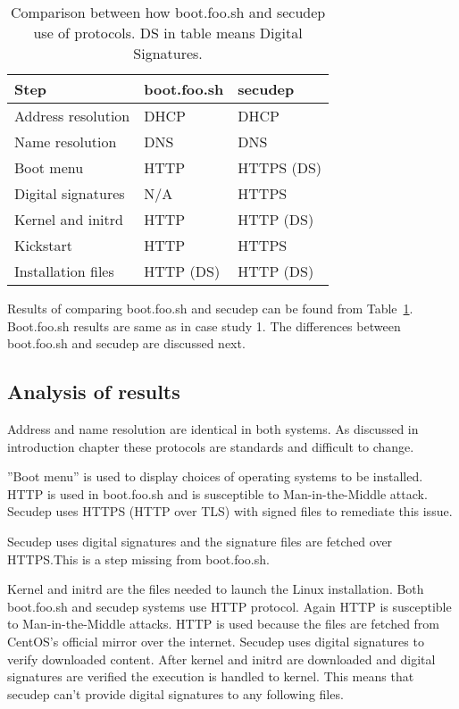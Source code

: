 \begin{table}[!ht]
  \def\arraystretch{1.1}%
  \begin{center}
    \begin{tabular}{| l | l | l |}
      \hline
      Step               & boot.foo.sh   & secudep    \\
      \hline
      Address resolution & DHCP          & DHCP       \\
      Name resolution    & DNS           & DNS        \\
      Boot menu          & HTTP          & HTTPS (DS) \\
      Digital signatures & N/A           & HTTPS      \\
      Kernel and initrd  & HTTP          & HTTP (DS)  \\
      Kickstart          & HTTP          & HTTPS      \\
      Installation files & HTTP (DS)     & HTTP (DS)  \\
      \hline
    \end{tabular}
    \caption{Comparison between how boot.foo.sh and secudep use of
      protocols. DS in table means Digital
      Signatures.\label{tab:comparison_table}}
  \end{center}
\end{table}

Results of comparing boot.foo.sh and secudep can be found from
Table~\ref{tab:comparison_table}. Boot.foo.sh results are same as in
case study 1. The differences between boot.foo.sh and secudep are
discussed next.


\subsection{Analysis of results}

Address and name resolution are identical in both systems. As
discussed in introduction chapter these protocols are standards and
difficult to change.

''Boot menu'' is used to display choices of operating systems to be
installed. HTTP is used in boot.foo.sh and is susceptible to
Man-in-the-Middle attack. Secudep uses HTTPS (HTTP over TLS) with
signed files to remediate this issue.

Secudep uses digital signatures and the signature files are fetched
over HTTPS.\@ This is a step missing from boot.foo.sh.

Kernel and initrd are the files needed to launch the Linux
installation. Both boot.foo.sh and secudep systems use HTTP
protocol. Again HTTP is susceptible to Man-in-the-Middle attacks. HTTP
is used because the files are fetched from CentOS's official mirror
over the internet. Secudep uses digital signatures to verify
downloaded content. After kernel and initrd are downloaded and digital
signatures are verified the execution is handled to kernel. This means
that secudep can't provide digital signatures to any following files.



